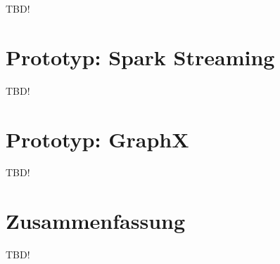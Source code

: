 TBD!


\section{Prototyp: Spark Streaming }
\label{section:prototyp spark streaming}

TBD!



\section{Prototyp: GraphX}
\label{section:prototyp graphX}

TBD!




\section{Zusammenfassung}
\label{section:zusammen}



TBD!


